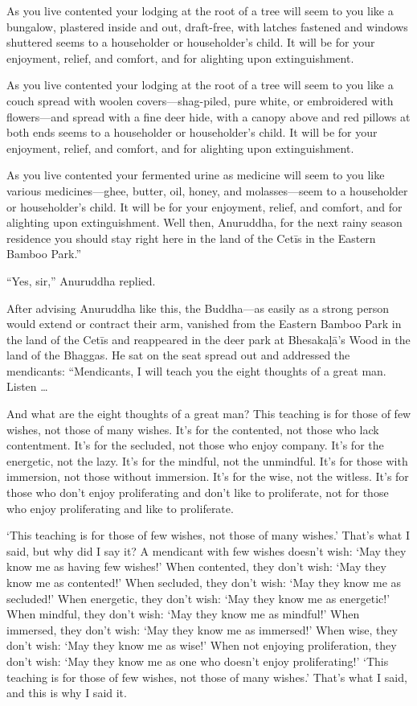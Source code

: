 \documentclass[12pt,openany]{book}%
\begin{document}
As you live contented your lodging at the root of a tree will seem to you like a bungalow, plastered inside and out, draft-free, with latches fastened and windows shuttered seems to a householder or householder’s child. It will be for your enjoyment, relief, and comfort, and for alighting upon extinguishment. 

As you live contented your lodging at the root of a tree will seem to you like a couch spread with woolen covers—shag-piled, pure white, or embroidered with flowers—and spread with a fine deer hide, with a canopy above and red pillows at both ends seems to a householder or householder’s child. It will be for your enjoyment, relief, and comfort, and for alighting upon extinguishment. 

As you live contented your fermented urine as medicine will seem to you like various medicines—ghee, butter, oil, honey, and molasses—seem to a householder or householder’s child. It will be for your enjoyment, relief, and comfort, and for alighting upon extinguishment. Well then, Anuruddha, for the next rainy season residence you should stay right here in the land of the \textsanskrit{Cetīs} in the Eastern Bamboo Park.” 

“Yes, sir,” Anuruddha replied. 

After advising Anuruddha like this, the Buddha—as easily as a strong person would extend or contract their arm, vanished from the Eastern Bamboo Park in the land of the \textsanskrit{Cetīs} and reappeared in the deer park at \textsanskrit{Bhesakaḷā}’s Wood in the land of the Bhaggas. He sat on the seat spread out and addressed the mendicants: “Mendicants, I will teach you the eight thoughts of a great man. Listen … 

And what are the eight thoughts of a great man? This teaching is for those of few wishes, not those of many wishes. It’s for the contented, not those who lack contentment. It’s for the secluded, not those who enjoy company. It’s for the energetic, not the lazy. It’s for the mindful, not the unmindful. It’s for those with immersion, not those without immersion. It’s for the wise, not the witless. It’s for those who don’t enjoy proliferating and don’t like to proliferate, not for those who enjoy proliferating and like to proliferate. 

‘This teaching is for those of few wishes, not those of many wishes.’ That’s what I said, but why did I say it? A mendicant with few wishes doesn’t wish: ‘May they know me as having few wishes!’ When contented, they don’t wish: ‘May they know me as contented!’ When secluded, they don’t wish: ‘May they know me as secluded!’ When energetic, they don’t wish: ‘May they know me as energetic!’ When mindful, they don’t wish: ‘May they know me as mindful!’ When immersed, they don’t wish: ‘May they know me as immersed!’ When wise, they don’t wish: ‘May they know me as wise!’ When not enjoying proliferation, they don’t wish: ‘May they know me as one who doesn’t enjoy proliferating!’ ‘This teaching is for those of few wishes, not those of many wishes.’ That’s what I said, and this is why I said it. 
\end{document}

